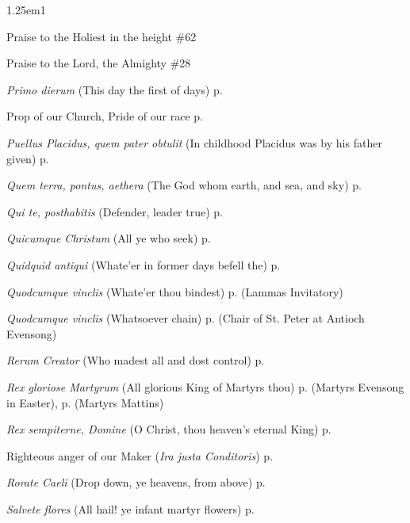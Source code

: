 \begin{hangparas}{1.25em}{1}
\par\noindent
Praise to the Holiest in the height \dotfill \#62
\par\noindent
Praise to the Lord, the Almighty \dotfill \#28
\par\noindent
\textit{Primo dierum} (This day the first of days) \dotfill p. \pageref{SundayInvitatoryWinter}
\par\noindent
Prop of our Church, Pride of our race \dotfill p. \pageref{EliasIIEvensong}
\par\noindent
\textit{Puellus Placidus, quem pater obtulit} (In childhood Placidus was by his father given) \dotfill p. \pageref{MaurusInvitatory}
\par\noindent
\textit{Quem terra, pontus, aethera} (The God whom earth, and sea, and sky) \dotfill p. \pageref{BVMInvitatory}
\par\noindent
\textit{Qui te, posthabitis} (Defender, leader true) \dotfill p. \pageref{MaurusEvensong}
\par\noindent
\textit{Quicumque Christum} (All ye who seek) \dotfill p. \pageref{TransfigurationEvensong}
\par\noindent
\textit{Quidquid antiqui} (Whate'er in former days befell the) \dotfill p. \pageref{BenedictInvitatory}
\par\noindent
\textit{Quodcumque vinclis} (Whate'er thou bindest) \dotfill p. \pageref{LammasInvitatory} (Lammas Invitatory)
\par\noindent
\textit{Quodcumque vinclis} (Whatsoever chain) \dotfill p. \pageref{PeterAntiochEvensong} (Chair of St. Peter at Antioch Evensong)
\par\noindent
\textit{Rerum Creator} (Who madest all and dost control) \dotfill p. \pageref{WednesdayInvitatory}
\par\noindent
\textit{Rex gloriose Martyrum} (All glorious King of Martyrs thou) \dotfill p. \pageref{MartyrsEvensongEaster} (Martyrs Evensong in Easter), p. \pageref{MartyrsMattins} (Martyrs Mattins)
\par\noindent
\textit{Rex sempiterne, Domine} (O Christ, thou heaven's eternal King) \dotfill p. \pageref{EasterDayInvitatory}
\par\noindent
Righteous anger of our Maker (\textit{Ira justa Conditoris}) \dotfill p. \pageref{PreciousBloodInvitatory}
\par\noindent
\textit{Rorate Caeli} (Drop down, ye heavens, from above) \dotfill p. \pageref{AdventProse}
\par\noindent
\textit{Salvete flores} (All hail! ye infant martyr flowers) \dotfill p. \pageref{HolyInnocentsMattinsHymn}

\end{hangparas}

